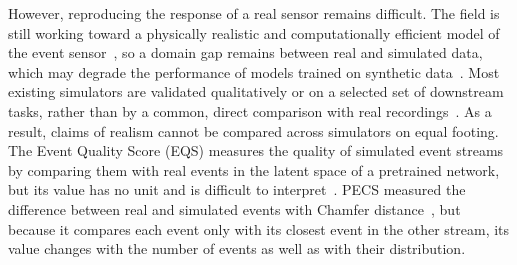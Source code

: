 



However, reproducing the response of a real sensor remains difficult. The field is still working toward a physically realistic and computationally efficient model of the event sensor~\cite{graca2025sensormodel}, so a domain gap remains between real and simulated data, which may degrade the performance of models trained on synthetic data~\cite{tan2025carla}. Most existing simulators are validated qualitatively or on a selected set of downstream tasks, rather than by a common, direct comparison with real recordings~\cite{hu2021v2e,lin2022dvsvoltmeter,tan2025carla,chen2024instance}. As a result, claims of realism cannot be compared across simulators on equal footing. The Event Quality Score (EQS) measures the quality of simulated event streams by comparing them with real events in the latent space of a pretrained network, but its value has no unit and is difficult to interpret~\cite{chanda2025eqs}. PECS measured the difference between real and simulated events with Chamfer distance~\cite{han2024pecs}, but because it compares each event only with its closest event in the other stream, its value changes with the number of events as well as with their distribution.

